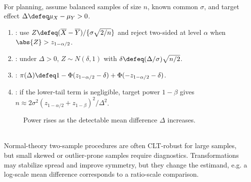 \begin{method} \label{meth:two-sample-normal-power-balanced} \\
For planning, assume balanced samples of size $n$, known common $\sigma$, and target effect $\Delta\defeq\mu_X-\mu_Y>0$.
\begin{enumerate}[label=(\roman*)]
\setlength{\itemsep}{0pt}
\item {}: use $Z\defeq(\overline{X}-\overline{Y})/\{\sigma\sqrt{2/n}\}$ and reject two-sided at level $\alpha$ when $\abs{Z}>z_{1-\alpha/2}$.
\item {}: under $\Delta>0$, $Z\sim N(\delta,1)$ with $\delta\defeq(\Delta/\sigma)\sqrt{n/2}$.
\item {}: $\pi(\Delta)\defeq1-\Phi(z_{1-\alpha/2}-\delta)+\Phi(-z_{1-\alpha/2}-\delta)$.
\item {}: if the lower-tail term is negligible, target power $1-\beta$ gives $n\approx2\sigma^2(z_{1-\alpha/2}+z_{1-\beta})^2/\Delta^2$.
\end{enumerate}
\end{method}

\begin{figure}[H]
  \centering
  
  \caption{Power rises as the detectable mean difference $\Delta$ increases.}
  \label{fig:two-sample-power-curve}
\end{figure}

\begin{remark} \label{rem:two-sample-transformations-and-diagnostics} \\
Normal-theory two-sample procedures are often CLT-robust for large samples, but small skewed or outlier-prone samples require diagnostics. Transformations may stabilize spread and improve symmetry, but they change the estimand, e.g. a log-scale mean difference corresponds to a ratio-scale comparison.
\end{remark}
